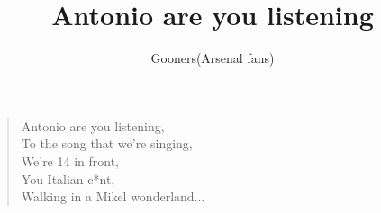 \documentclass[a4paper,12pt]{article}
\title{Antonio are you listening}
\author{Gooners(Arsenal fans)}
\date{}
\begin{document}
	
	\maketitle
	
	\begin{verse}
		
		Antonio are you listening, \\
		To the song that we're singing, \\
		We're 14 in front, \\
		You Italian c*nt, \\
		Walking in a Mikel wonderland$\ldots$
		
	\end{verse}
	
\end{document}
